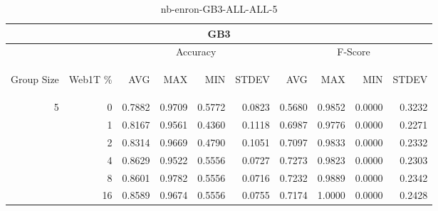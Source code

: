 \begin{center}
\begin{table}[htbp] 
 \begin{center}
\begin{tabular}{ | r | r | r | r | r | r | r | r | r | r |}
\hline
\multicolumn{10}{|c|}{GB3}\\
\hline
 & & \multicolumn{4}{|c|}{Accuracy} & \multicolumn{4}{|c|}{F-Score}\\ \cline{3-10}
\begin{sideways}Group Size\end{sideways} & \begin{sideways}Web1T \%\end{sideways} & \begin{sideways}AVG\end{sideways} & \begin{sideways}MAX\end{sideways} & \begin{sideways}MIN\end{sideways} & \begin{sideways}STDEV\end{sideways} & \begin{sideways}AVG\end{sideways} & \begin{sideways}MAX\end{sideways} & \begin{sideways}MIN\end{sideways} & \begin{sideways}STDEV\end{sideways}\\
\hline
\multirow{5}{*}{5}
 & 0 & 0.7882 & 0.9709 & 0.5772 & 0.0823 & 0.5680 & 0.9852 & 0.0000 & 0.3232\\ \cline{2-10}
 & 1 & 0.8167 & 0.9561 & 0.4360 & 0.1118 & 0.6987 & 0.9776 & 0.0000 & 0.2271\\ \cline{2-10}
 & 2 & 0.8314 & 0.9669 & 0.4790 & 0.1051 & 0.7097 & 0.9833 & 0.0000 & 0.2332\\ \cline{2-10}
 & 4 & 0.8629 & 0.9522 & 0.5556 & 0.0727 & 0.7273 & 0.9823 & 0.0000 & 0.2303\\ \cline{2-10}
 & 8 & 0.8601 & 0.9782 & 0.5556 & 0.0716 & 0.7232 & 0.9889 & 0.0000 & 0.2342\\ \cline{2-10}
 & 16 & 0.8589 & 0.9674 & 0.5556 & 0.0755 & 0.7174 & 1.0000 & 0.0000 & 0.2428\\ \cline{2-10}
\hline
\end{tabular}
\caption{nb-enron-GB3-ALL-ALL-5}
\label{table:nb-enron-GB3-ALL-ALL-5}
\end{center}
 \end{table}
\end{center}

